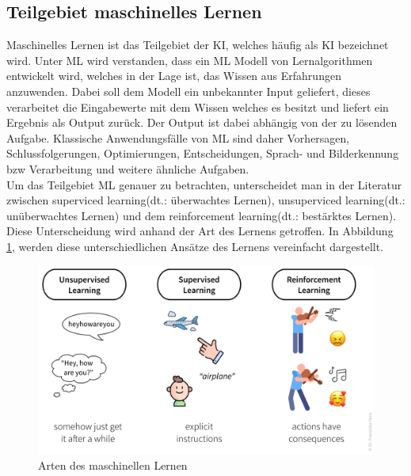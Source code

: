 \begin{onehalfspace}
    \subsection{Teilgebiet maschinelles Lernen}
    \label{subsubsec:teilgebietML}
        Maschinelles Lernen ist das Teilgebiet der \ac{KI}, welches häufig als \ac*{KI} bezeichnet wird. Unter \ac{ML} wird verstanden, dass ein \ac*{ML} Modell von Lernalgorithmen entwickelt wird, welches in der Lage ist, das Wissen aus Erfahrungen anzuwenden. Dabei soll dem Modell ein unbekannter Input geliefert, dieses verarbeitet die Eingabewerte mit dem Wissen welches es besitzt und liefert ein Ergebnis als Output zurück. Der Output ist dabei abhängig von der zu lösenden Aufgabe. Klassische Anwendungsfälle von \ac*{ML} sind daher Vorhersagen, Schlussfolgerungen, Optimierungen, Entscheidungen, Sprach- und Bilderkennung \ac*{bzw} Verarbeitung und weitere ähnliche Aufgaben.\cite{HEGKI2019}
        \\
        Um das Teilgebiet \ac{ML} genauer zu betrachten, unterscheidet man in der Literatur zwischen \glqq{}superviced learning\grqq{}(\ac*{dt}.: überwachtes Lernen), \glqq{}unsuperviced learning\grqq{}(\ac*{dt}.: unüberwachtes Lernen) und dem \glqq{}reinforcement learning\grqq{}(\ac*{dt}.: bestärktes Lernen).\cite{Datenkommission2019} Diese Unterscheidung wird anhand der Art des Lernens getroffen.\cite{Horn2022} In Abbildung \ref*{fig:ml_algorithms}, werden diese unterschiedlichen Ansätze des Lernens vereinfacht dargestellt. 
        \begin{figure}[h]
            \centering
            \includegraphics[width = 14cm]{Bilder/ml_algorithms.png}
            \caption{Arten des maschinellen Lernen\cite{Horn2022}}
            \label{fig:ml_algorithms}
        \end{figure}
        \\

\end{onehalfspace}
